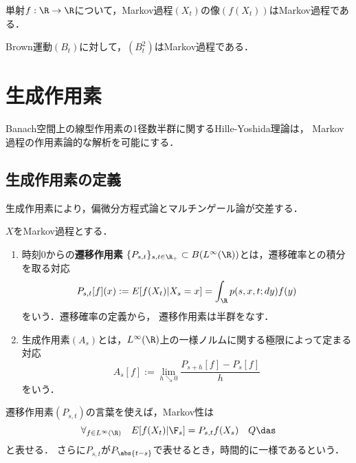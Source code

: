 \documentclass[uplatex,dvipdfmx]{jsreport}
\begin{document}
\begin{proposition}[単射による保存]
    単射$f:\R\to\R$について，Markov過程$(X_t)$の像$(f(X_t))$はMarkov過程である．
\end{proposition}

\begin{proposition}
    Brown運動$(B_t)$に対して，$(B_t^2)$はMarkov過程である．
\end{proposition}

\section{生成作用素}

\begin{tcolorbox}[colframe=ForestGreen, colback=ForestGreen!10!white,breakable,colbacktitle=ForestGreen!40!white,coltitle=black,fonttitle=\bfseries\sffamily,
title=]
    Banach空間上の線型作用素の1径数半群に関するHille-Yoshida理論は，
    Markov過程の作用素論的な解析を可能にする．
\end{tcolorbox}

\subsection{生成作用素の定義}

\begin{tcolorbox}[colframe=ForestGreen, colback=ForestGreen!10!white,breakable,colbacktitle=ForestGreen!40!white,coltitle=black,fonttitle=\bfseries\sffamily,
title=]
    生成作用素により，偏微分方程式論とマルチンゲール論が交差する．
\end{tcolorbox}

\begin{definition}
    $X$をMarkov過程とする．
    \begin{enumerate}
        \item 時刻$0$からの\textbf{遷移作用素}
        $\{P_{s,t}\}_{s,t\in\R_+}\subset B(L^\infty(\R))$とは，遷移確率との積分を取る対応
        \[P_{s,t}[f](x):=E[f(X_t)|X_s=x]=\int_\R p(s,x,t;dy)f(y)\]
        をいう．遷移確率の定義から，
        遷移作用素は半群をなす．
        \item 生成作用素$(A_s)$とは，$L^\infty(\R)$上の一様ノルムに関する極限によって定まる対応
        \[A_s[f]:=\lim_{h\searrow0}\frac{P_{s+h}[f]-P_s[f]}{h}\]
        をいう．
    \end{enumerate}
\end{definition}

\begin{remarks}
    遷移作用素$(P_{s,t})$の言葉を使えば，Markov性は
    \[\forall_{f\in L^\infty(\R)}\quad E[f(X_t)|\F_s]=P_{s,t}f(X_s)\quad Q\das\]
    と表せる．
    さらに$P_{s,t}$が$P_{\abs{t-s}}$で表せるとき，時間的に一様であるという．
\end{remarks}
\end{document}

